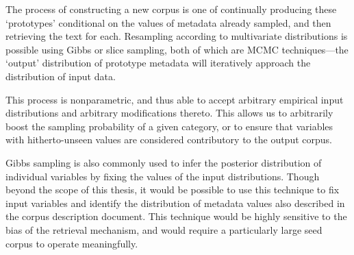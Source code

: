 The process of constructing a new corpus is one of continually producing these `prototypes' conditional on the values of metadata already sampled, and then retrieving the text for each.  Resampling according to multivariate distributions is possible using Gibbs or slice sampling, both of which are MCMC techniques---the `output' distribution of prototype metadata will iteratively approach the distribution of input data.

This process is nonparametric, and thus able to accept arbitrary empirical input distributions and arbitrary modifications thereto.  This allows us to arbitrarily boost the sampling probability of a given category, or to ensure that variables with hitherto-unseen values are considered contributory to the output corpus.

Gibbs sampling is also commonly used to infer the posterior distribution of individual variables by fixing the values of the input distributions.  Though beyond the scope of this thesis, it would be possible to use this technique to fix input variables and identify the distribution of metadata values also described in the corpus description document.  This technique would be highly sensitive to the bias of the retrieval mechanism, and would require a particularly large seed corpus to operate meaningfully.













